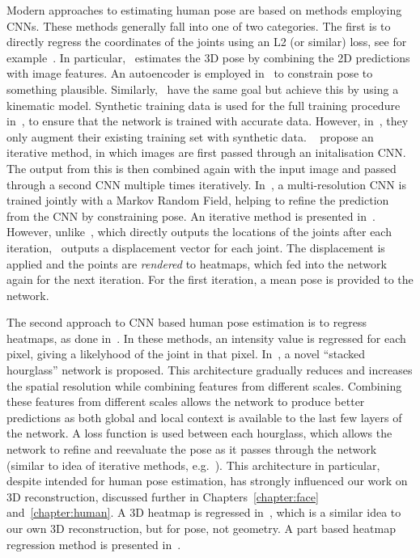 Modern approaches to estimating human pose are based on methods
employing CNNs. These methods generally fall into one of two
categories. The first is to directly regress the coordinates of the
joints using an L2 (or similar) loss, see for
example~\cite{li20143d,park20163d,tekin2016structured,tekin2016direct,zhou2016deep,chen2016synthesizing,ghezelghieh2016learning,toshev2014deeppose,tompson2014joint}. In
particular,~\cite{park20163d} estimates the 3D pose by combining the
2D predictions with image features. An autoencoder is employed
in~\cite{tekin2016structured} to constrain pose to something
plausible. Similarly,~\cite{zhou2016deep} have the same goal but
achieve this by using a kinematic model. Synthetic training data is
used for the full training procedure in~\cite{chen2016synthesizing},
to ensure that the network is trained with accurate data. However,
in~\cite{ghezelghieh2016learning}, they only augment their existing
training set with synthetic data. ~\cite{toshev2014deeppose} propose
an iterative method, in which images are first passed through an
initalisation CNN. The output from this is then combined again with
the input image and passed through a second CNN multiple times
iteratively.  In~\cite{tompson2014joint}, a multi-resolution CNN is
trained jointly with a Markov Random Field, helping to refine the
prediction from the CNN by constraining pose. An iterative method is
presented in~\cite{carreira2016human}. However,
unlike~\cite{toshev2014deeppose}, which directly outputs the locations
of the joints after each iteration,~\cite{carreira2016human} outputs a
displacement vector for each joint. The displacement is applied and
the points are \textit{rendered} to heatmaps, which fed into the
network again for the next iteration. For the first iteration, a mean
pose is provided to the network.

The second approach to CNN based human pose estimation is to regress
heatmaps, as done
in~\cite{newell2016stacked,pfister2015flowing,zhou2016sparseness,pavlakos2017coarse,mehta2017vnect,zhao2018through}. In
these methods, an intensity value is regressed for each pixel, giving
a likelyhood of the joint in that pixel.
In~\cite{newell2016stacked}, a novel ``stacked hourglass'' network is
proposed. This architecture gradually reduces and increases the
spatial resolution while combining features from different
scales. Combining these features from different scales allows the
network to produce better predictions as both global and local context
is available to the last few layers of the network. A loss function is
used between each hourglass, which allows the network to refine and
reevaluate the pose as it passes through the network (similar to idea
of iterative methods,
e.g.~\cite{toshev2014deeppose,carreira2016human}). This architecture
in particular, despite intended for human pose estimation, has
strongly influenced our work on 3D reconstruction, discussed further
in Chapters~\ref{chapter:face} and~\ref{chapter:human}. A 3D heatmap
is regressed in~\cite{pavlakos2017coarse}, which is a similar idea to
our own 3D reconstruction, but for pose, not geometry. A part based
heatmap regression method is presented in~\cite{mehta2017vnect}.

